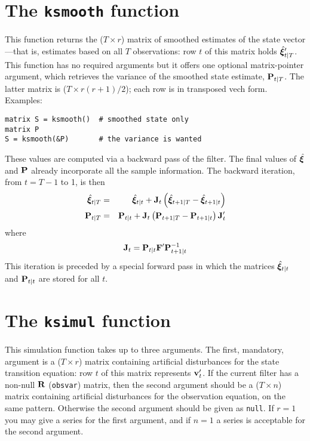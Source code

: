 \documentclass[a4paper]{article}
\newcommand{\obsvar}{\ensuremath\mathbf{R}}
\newcommand{\statevec}{\ensuremath\mathbf{\bm \xi}}
\newcommand{\statemat}{\ensuremath\mathbf{F}}
\newcommand{\strdist}{\ensuremath\mathbf{v}}
\newcommand{\statevar}{\ensuremath\mathbf{P}}
\begin{document}
\section{The \texttt{ksmooth} function}

This function returns the ($T \times r$) matrix of smoothed estimates
of the state vector---that is, estimates based on all $T$
observations: row $t$ of this matrix holds $\hat{\statevec}_{t|T}'$.  This
function has no required arguments but it offers one optional
matrix-pointer argument, which retrieves the variance of the smoothed
state estimate, $\statevar_{t|T}$.  The latter matrix is ($T \times
r(r+1)/2$); each row is in transposed vech form.  Examples:
%
\begin{verbatim}
matrix S = ksmooth()  # smoothed state only
matrix P
S = ksmooth(&P)       # the variance is wanted
\end{verbatim}

These values are computed via a backward pass of the filter.  The
final values of $\hat{\statevec}$ and $\statevar$ already incorporate
all the sample information.  The backward iteration, from $t=T-1$ to
1, is then
%
\begin{eqnarray*}
\hat{\statevec}_{t|T} &=& \hat{\statevec}_{t|t} + 
  \mathbf{J}_t\left(\hat{\statevec}_{t+1|T} - \hat{\statevec}_{t+1|t}\right) \\
\statevar_{t|T} &=& \statevar_{t|t} + 
  \mathbf{J}_t\left(\statevar_{t+1|T} - \statevar_{t+1|t}\right) \mathbf{J}_t'
\end{eqnarray*}
%
where
\[
\mathbf{J}_t = \statevar_{t|t} \statemat' \statevar_{t+1|t}^{-1}
\]
%
This iteration is preceded by a special forward pass in which the
matrices $\hat{\statevec}_{t|t}$ and $\statevar_{t|t}$ are stored
for all $t$.


\section{The \texttt{ksimul} function}

This simulation function takes up to three arguments.  The first,
mandatory, argument is a ($T \times r$) matrix containing artificial
disturbances for the state transition equation: row $t$ of this matrix
represents $\strdist_t'$.  If the current filter has a non-null
$\obsvar$ (\texttt{obsvar}) matrix, then the second argument should be
a ($T \times n$) matrix containing artificial disturbances for the
observation equation, on the same pattern.  Otherwise the second
argument should be given as \texttt{null}.  If $r=1$ you may give a
series for the first argument, and if $n=1$ a series is acceptable for
the second argument.
\end{document}
